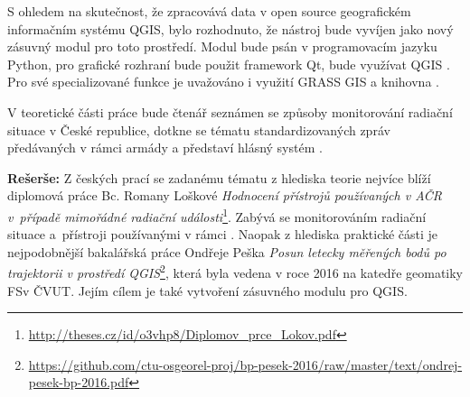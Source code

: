 S ohledem na skutečnost, že  zpracovává data v open source
geografickém informačním systému QGIS, bylo rozhodnuto, že nástroj
bude vyvíjen jako nový zásuvný modul pro toto prostředí. Modul bude
psán v programovacím jazyku Python, pro grafické rozhraní bude použit
framework Qt, bude využívat QGIS . Pro své specializované
funkce je uvažováno i využití GRASS GIS  a knihovna .

V teoretické části práce bude čtenář seznámen se způsoby monitorování
radiační situace v České republice, dotkne se tématu standardizovaných
zpráv předávaných v rámci armády a představí hlásný systém .

\textbf{Rešerše:} Z českých prací se zadanému tématu z hlediska teorie
nejvíce blíží diplomová práce Bc. Romany Loškové \textit{Hodnocení
přístrojů používaných v AČR v~případě mimořádné radiační
události}\footnote{\url{http://theses.cz/id/o3vhp8/Diplomov_prce_Lokov.pdf}}. Zabývá
se monitorováním radiační situace a~přístroji používanými v rámci
. Naopak z hlediska praktické části je nejpodobnější
bakalářská práce Ondřeje Peška \textit{Posun letecky měřených bodů po
  trajektorii v prostředí
QGIS}\footnote{\url{https://github.com/ctu-osgeorel-proj/bp-pesek-2016/raw/master/text/ondrej-pesek-bp-2016.pdf}},
která byla vedena v roce 2016 na katedře geomatiky FSv ČVUT. Jejím
cílem je také vytvoření zásuvného modulu pro QGIS.